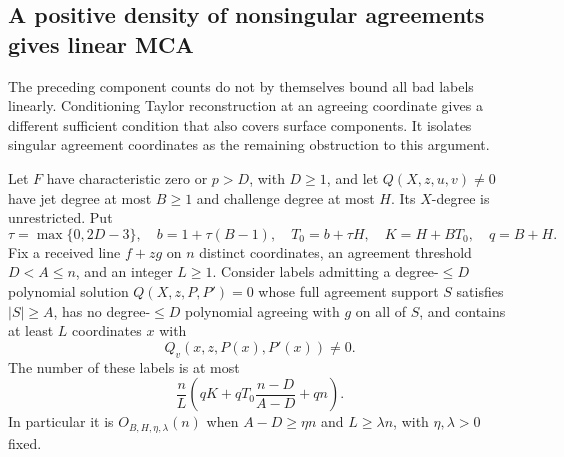 \subsection{A positive density of nonsingular agreements gives linear MCA}
\label{sec:nonsingular-agreement-mca}

The preceding component counts do not by themselves bound all bad
labels linearly. Conditioning Taylor reconstruction at an agreeing
coordinate gives a different sufficient condition that also covers
surface components. It isolates singular agreement coordinates as
the remaining obstruction to this argument.

\begin{theorem}
\label{thm:nonsingular-agreement-mca}
Let $F$ have characteristic zero or $p>D$, with $D\ge1$, and let
$Q(X,z,u,v)\ne0$ have jet degree at most $B\ge1$ and challenge
degree at most $H$. Its $X$-degree is unrestricted. Put
\[
 \tau=\max\{0,2D-3\},\quad b=1+\tau(B-1),\quad
 T_0=b+\tau H,\quad K=H+BT_0,\quad q=B+H.
\]
Fix a received line $f+zg$ on $n$ distinct coordinates, an agreement
threshold $D<A\le n$, and an integer $L\ge1$.
Consider labels admitting a degree-$\le D$ polynomial solution
$Q(X,z,P,P')=0$ whose full agreement support $S$ satisfies
$|S|\ge A$, has no degree-$\le D$ polynomial agreeing with $g$ on
all of $S$, and contains at least $L$ coordinates $x$ with
\[
 Q_v(x,z,P(x),P'(x))\ne0.
\]
The number of these labels is at most
\begin{equation}
 \frac nL\left(qK+qT_0\frac{n-D}{A-D}+qn\right).
 \label{eq:nonsingular-agreement-bound}
\end{equation}
In particular it is $O_{B,H,\eta,\lambda}(n)$ when
$A-D\ge\eta n$ and $L\ge\lambda n$, with $\eta,\lambda>0$ fixed.
\end{theorem}
